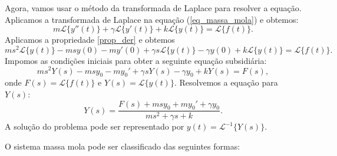 Agora, vamos usar o método da transformada de Laplace para resolver a equação. Aplicamos a transformada de Laplace na equação (\ref{eq_massa_mola}) e obtemos:
$$
m\mathcal{L}\{y''(t)\}+\gamma \mathcal{L}\{y'(t)\}+k\mathcal{L}\{y(t)\}=\mathcal{L}\{f(t)\}.
$$
Aplicamos a propriedade \ref{prop_der} e obtemos
$$
ms^2\mathcal{L}\{y(t)\}-msy(0)-my'(0)+\gamma s\mathcal{L}\{y(t)\}-\gamma y(0)+k\mathcal{L}\{y(t)\}=\mathcal{L}\{f(t)\}.
$$
Impomos as condições iniciais para obter a seguinte equação subsidiária:
$$
ms^2Y(s)-msy_0-my_0'+\gamma sY(s)-\gamma y_0+kY(s)=F(s),
$$
onde $F(s)=\mathcal{L}\{f(t)\}$ e $Y(s)=\mathcal{L}\{y(t)\}$. Resolvemos a equação para $Y(s)$:
$$
Y(s)=\frac{F(s)+msy_0+my_0'+\gamma y_0}{ms^2+\gamma s +k}.
$$
A solução do problema pode ser representado por $y(t)=\mathcal{L}^{-1}\{Y(s)\}$. 

O sistema massa mola pode ser classificado das seguintes formas:
